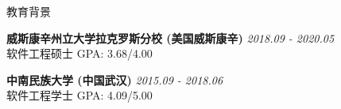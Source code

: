 \documentclass{resume} %
\begin{document}
\begin{rSection}{教育背景}

{\bf 威斯康辛州立大学拉克罗斯分校 (美国威斯康辛)} \hfill {\em 2018.09 - 2020.05} 
\\ 软件工程硕士 \hfill {GPA: 3.68/4.00}

{\bf 中南民族大学 (中国武汉)} \hfill {\em 2015.09 - 2018.06} 
\\ 软件工程学士 \hfill {GPA: 4.09/5.00}

\end{rSection}


\end{document}
